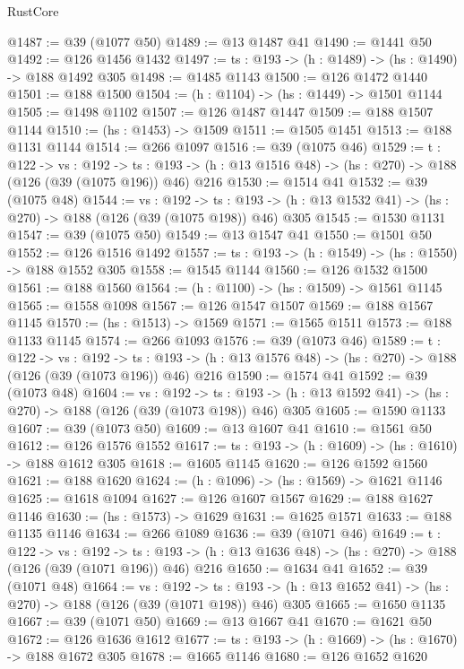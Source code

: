 \begin{lexlean}{RustCore}
\begin{coremodule}
@1487 := @39 (@1077 @50)
@1489 := @13 @1487 @41
@1490 := @1441 @50
@1492 := @126 @1456 @1432
@1497 := {ts : @193} -> (h : @1489) -> (hs : @1490) -> @188 @1492 @305
@1498 := @1485 @1143
@1500 := @126 @1472 @1440
@1501 := @188 @1500
@1504 := (h : @1104) -> (hs : @1449) -> @1501 @1144
@1505 := @1498 @1102
@1507 := @126 @1487 @1447
@1509 := @188 @1507 @1144
@1510 := (hs : @1453) -> @1509
@1511 := @1505 @1451
@1513 := @188 @1131 @1144
@1514 := @266 @1097
@1516 := @39 (@1075 @46)
@1529 := {t : @122} ->
  {vs : @192} ->
  {ts : @193} -> (h : @13 @1516 @48) -> (hs : @270) -> @188 (@126 (@39 (@1075 @196)) @46) @216
@1530 := @1514 @41
@1532 := @39 (@1075 @48)
@1544 := {vs : @192} ->
  {ts : @193} -> (h : @13 @1532 @41) -> (hs : @270) -> @188 (@126 (@39 (@1075 @198)) @46) @305
@1545 := @1530 @1131
@1547 := @39 (@1075 @50)
@1549 := @13 @1547 @41
@1550 := @1501 @50
@1552 := @126 @1516 @1492
@1557 := {ts : @193} -> (h : @1549) -> (hs : @1550) -> @188 @1552 @305
@1558 := @1545 @1144
@1560 := @126 @1532 @1500
@1561 := @188 @1560
@1564 := (h : @1100) -> (hs : @1509) -> @1561 @1145
@1565 := @1558 @1098
@1567 := @126 @1547 @1507
@1569 := @188 @1567 @1145
@1570 := (hs : @1513) -> @1569
@1571 := @1565 @1511
@1573 := @188 @1133 @1145
@1574 := @266 @1093
@1576 := @39 (@1073 @46)
@1589 := {t : @122} ->
  {vs : @192} ->
  {ts : @193} -> (h : @13 @1576 @48) -> (hs : @270) -> @188 (@126 (@39 (@1073 @196)) @46) @216
@1590 := @1574 @41
@1592 := @39 (@1073 @48)
@1604 := {vs : @192} ->
  {ts : @193} -> (h : @13 @1592 @41) -> (hs : @270) -> @188 (@126 (@39 (@1073 @198)) @46) @305
@1605 := @1590 @1133
@1607 := @39 (@1073 @50)
@1609 := @13 @1607 @41
@1610 := @1561 @50
@1612 := @126 @1576 @1552
@1617 := {ts : @193} -> (h : @1609) -> (hs : @1610) -> @188 @1612 @305
@1618 := @1605 @1145
@1620 := @126 @1592 @1560
@1621 := @188 @1620
@1624 := (h : @1096) -> (hs : @1569) -> @1621 @1146
@1625 := @1618 @1094
@1627 := @126 @1607 @1567
@1629 := @188 @1627 @1146
@1630 := (hs : @1573) -> @1629
@1631 := @1625 @1571
@1633 := @188 @1135 @1146
@1634 := @266 @1089
@1636 := @39 (@1071 @46)
@1649 := {t : @122} ->
  {vs : @192} ->
  {ts : @193} -> (h : @13 @1636 @48) -> (hs : @270) -> @188 (@126 (@39 (@1071 @196)) @46) @216
@1650 := @1634 @41
@1652 := @39 (@1071 @48)
@1664 := {vs : @192} ->
  {ts : @193} -> (h : @13 @1652 @41) -> (hs : @270) -> @188 (@126 (@39 (@1071 @198)) @46) @305
@1665 := @1650 @1135
@1667 := @39 (@1071 @50)
@1669 := @13 @1667 @41
@1670 := @1621 @50
@1672 := @126 @1636 @1612
@1677 := {ts : @193} -> (h : @1669) -> (hs : @1670) -> @188 @1672 @305
@1678 := @1665 @1146
@1680 := @126 @1652 @1620

\end{coremodule}
\end{lexlean}
